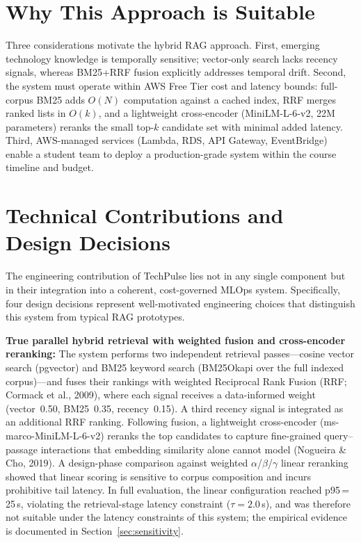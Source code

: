 \section{Why This Approach is Suitable}
\label{sec:method_rationale}

Three considerations motivate the hybrid RAG approach. First, emerging technology knowledge is temporally sensitive; vector-only search lacks recency signals, whereas BM25+RRF fusion explicitly addresses temporal drift. Second, the system must operate within AWS Free Tier cost and latency bounds: full-corpus BM25 adds $O(N)$ computation against a cached index, RRF merges ranked lists in $O(k)$, and a lightweight cross-encoder (MiniLM-L-6-v2, 22M parameters) reranks the small top-$k$ candidate set with minimal added latency. Third, AWS-managed services (Lambda, RDS, API Gateway, EventBridge) enable a student team to deploy a production-grade system within the course timeline and budget.

\section{Technical Contributions and Design Decisions}
\label{sec:innovation}

The engineering contribution of TechPulse lies not in any single component but in their integration into a coherent, cost-governed MLOps system. Specifically, four design decisions represent well-motivated engineering choices that distinguish this system from typical RAG prototypes.

\textbf{True parallel hybrid retrieval with weighted fusion and cross-encoder reranking:} The system performs two independent retrieval passes---cosine vector search (pgvector) and BM25 keyword search (BM25Okapi over the full indexed corpus)---and fuses their rankings with weighted Reciprocal Rank Fusion (RRF; Cormack et al., 2009), where each signal receives a data-informed weight (vector~0.50, BM25~0.35, recency~0.15). A third recency signal is integrated as an additional RRF ranking. Following fusion, a lightweight cross-encoder (ms-marco-MiniLM-L-6-v2) reranks the top candidates to capture fine-grained query--passage interactions that embedding similarity alone cannot model (Nogueira \& Cho, 2019). A design-phase comparison against weighted $\alpha$/$\beta$/$\gamma$ linear reranking showed that linear scoring is sensitive to corpus composition and incurs prohibitive tail latency. In full evaluation, the linear configuration reached p95\,=\,25\,s, violating the retrieval-stage latency constraint ($\tau = 2.0$\,s), and was therefore not suitable under the latency constraints of this system; the empirical evidence is documented in Section~\ref{sec:sensitivity}.

